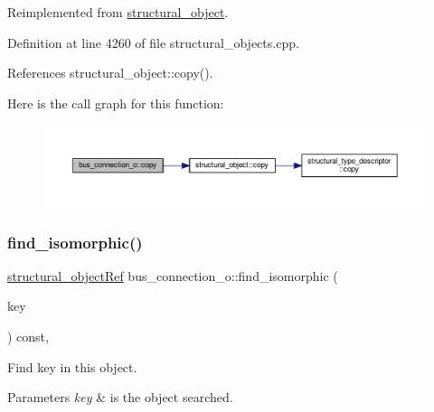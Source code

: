 Reimplemented from \hyperlink{classstructural__object_a6566435c67934f6b4ff1b319c0682b18}{structural\+\_\+object}.



Definition at line 4260 of file structural\+\_\+objects.\+cpp.



References structural\+\_\+object\+::copy().

Here is the call graph for this function\+:
\nopagebreak
\begin{figure}[H]
\begin{center}
\leavevmode
\includegraphics[width=350pt]{d3/dfb/classbus__connection__o_a67b9b2ec30278115a9c545fa082c633b_cgraph}
\end{center}
\end{figure}
\mbox{\label{classbus__connection__o_a13ea12ac5af275b177d449ef3a7c5546}} 
\subsubsection{\texorpdfstring{find\+\_\+isomorphic()}{find\_isomorphic()}}
{\footnotesize\ttfamily \hyperlink{structural__objects_8hpp_a8ea5f8cc50ab8f4c31e2751074ff60b2}{structural\+\_\+object\+Ref} bus\+\_\+connection\+\_\+o\+::find\+\_\+isomorphic (\begin{DoxyParamCaption}\item[{const \hyperlink{structural__objects_8hpp_a8ea5f8cc50ab8f4c31e2751074ff60b2}{structural\+\_\+object\+Ref}}]{key }\end{DoxyParamCaption}) const\hspace{0.3cm}{\ttfamily [override]}, {\ttfamily [virtual]}}



Find key in this object. 


\begin{DoxyParams}{Parameters}
{\em key} & is the object searched. \\
\hline
\end{DoxyParams}


